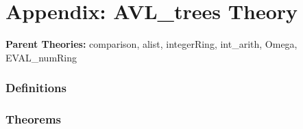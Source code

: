 \documentclass[a4paper,oneside,cleardoublepage=plain,bibliography=totoc]{scrbook}
\begin{document}


\renewcommand{\contentsname}{Table of Contents}  
\tableofcontents  %


\cleardoublepage{}

\chapter{Appendix: AVL\_trees Theory}



\begin{flushleft}
\textbf{Parent Theories:} comparison, alist, integerRing, int\_arith, Omega, EVAL\_numRing
\end{flushleft}

\subsection{Definitions}
\HOLAVLXXtreesDefinitions

\subsection{Theorems}
\HOLAVLXXtreesTheorems
\end{document}
